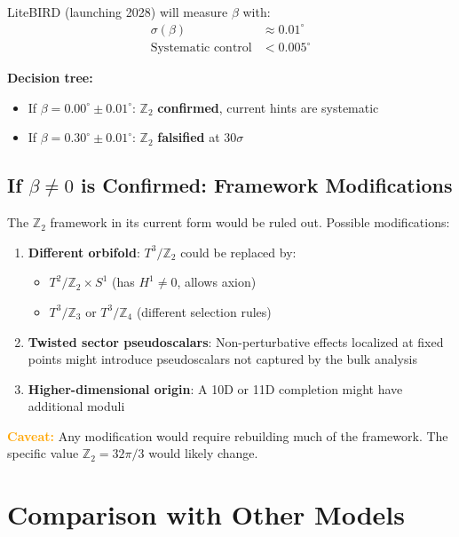\documentclass[12pt,a4paper]{article}
\begin{document}
LiteBIRD (launching 2028) will measure $\beta$ with:
\begin{align}
\sigma(\beta) &\approx 0.01^\circ \\
\text{Systematic control} &< 0.005^\circ
\end{align}

\textbf{Decision tree:}
\begin{itemize}
    \item If $\beta = 0.00^\circ \pm 0.01^\circ$: $\mathbb{Z}_2$ \textbf{confirmed}, current hints are systematic
    \item If $\beta = 0.30^\circ \pm 0.01^\circ$: $\mathbb{Z}_2$ \textbf{falsified} at $30\sigma$
\end{itemize}

\subsection{If $\beta \neq 0$ is Confirmed: Framework Modifications}

The $\mathbb{Z}_2$ framework in its current form would be ruled out. Possible modifications:

\begin{enumerate}
    \item \textbf{Different orbifold}: $T^3/\mathbb{Z}_2$ could be replaced by:
    \begin{itemize}
        \item $T^2/\mathbb{Z}_2 \times S^1$ (has $H^1 \neq 0$, allows axion)
        \item $T^3/\mathbb{Z}_3$ or $T^3/\mathbb{Z}_4$ (different selection rules)
    \end{itemize}

    \item \textbf{Twisted sector pseudoscalars}: Non-perturbative effects localized at fixed points might introduce pseudoscalars not captured by the bulk analysis

    \item \textbf{Higher-dimensional origin}: A 10D or 11D completion might have additional moduli
\end{enumerate}

\textcolor{orange}{\textbf{Caveat:}} Any modification would require rebuilding much of the framework. The specific value $\mathbb{Z}_2 = 32\pi/3$ would likely change.

\section{Comparison with Other Models}
\end{document}
